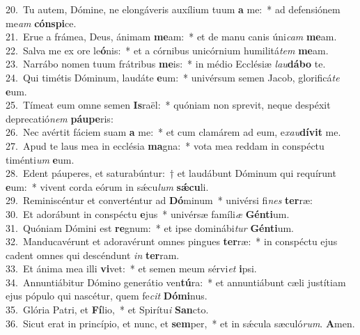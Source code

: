 {20.~}Tu autem, Dómine, ne elongáveris auxílium tuum \textbf{a} me:~* ad defensiónem me\textit{am} \textbf{cón}\textbf{spi}ce.\\
{21.~}Erue a frámea, Deus, ánimam \textbf{me}am:~* et de manu canis úni\textit{cam} \textbf{me}am.\\
{22.~}Salva me ex ore le\textbf{ó}nis:~* et a córnibus unicórnium humilitá\textit{tem} \textbf{me}am.\\
{23.~}Narrábo nomen tuum frátribus \textbf{me}is:~* in médio Ecclésiæ \textit{lau}\textbf{dá}\textbf{bo} te.\\
{24.~}Qui timétis Dóminum, laudáte \textbf{e}um:~* univérsum semen Jacob, glorificá\textit{te} \textbf{e}um.\\
{25.~}Tímeat eum omne semen \textbf{Is}raël:~* quóniam non sprevit, neque despéxit deprecatió\textit{nem} \textbf{páu}\textbf{pe}ris:\\
{26.~}Nec avértit fáciem suam \textbf{a} me:~* et cum clamárem ad eum, e\textit{xau}\textbf{dí}\textbf{vit} me.\\
{27.~}Apud te laus mea in ecclésia \textbf{ma}gna:~* vota mea reddam in conspéctu timénti\textit{um} \textbf{e}um.\\
{28.~}Edent páuperes, et saturabúntur:~† et laudábunt Dóminum qui requírunt \textbf{e}um:~* vivent corda eórum in sǽcu\textit{lum} \textbf{sǽ}\textbf{cu}li.\\
{29.~}Reminiscéntur et converténtur ad \textbf{Dó}minum~* univérsi fi\textit{nes} \textbf{ter}ræ:\\
{30.~}Et adorábunt in conspéctu \textbf{e}jus~* univérsæ famíli\textit{æ} \textbf{Gén}\textbf{ti}um.\\
{31.~}Quóniam Dómini est \textbf{re}gnum:~* et ipse dominábi\textit{tur} \textbf{Gén}\textbf{ti}um.\\
{32.~}Manducavérunt et adoravérunt omnes pingues \textbf{ter}ræ:~* in conspéctu ejus cadent omnes qui descéndunt \textit{in} \textbf{ter}ram.\\
{33.~}Et ánima mea illi \textbf{vi}vet:~* et semen meum sérvi\textit{et} \textbf{i}psi.\\
{34.~}Annuntiábitur Dómino generátio ven\textbf{tú}ra:~* et annuntiábunt cæli justítiam ejus pópulo qui nascétur, quem fe\textit{cit} \textbf{Dó}\textbf{mi}nus.\\
{35.~}Glória Patri, et \textbf{Fí}lio,~* et Spirítu\textit{i} \textbf{San}cto.\\
{36.~}Sicut erat in princípio, et nunc, et \textbf{sem}per,~* et in sǽcula sæculó\textit{rum}. \textbf{A}men.\\
